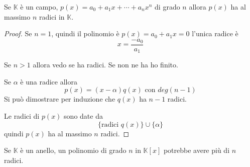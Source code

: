 \begin{theorem}
	Se $\mathbb{K}$ \`e un campo, $p(x) = a_0 + a_1 x + \cdots + a_n x^n$ di grado $n$ allora
	$p(x)$ ha al massimo $n$ radici in $\mathbb{K}$.
	\begin{proof}
		Se $n = 1$, quindi il polinomio \`e $p(x) = a_0 + a_1 x = 0$ l'unica radice \`e
		\begin{equation*}
			x = \frac{-a_0}{a_1}
		\end{equation*}

		Se $n > 1$ allora vedo se ha radici. Se non ne ha ho finito.

		Se $\alpha$ \`e una radice allora
		\begin{equation*}
			p(x) = (x - \alpha) q(x) \text{ con } deg(n - 1)
		\end{equation*}
		Si pu\`o dimostrare per induzione che $q(x)$ ha $n - 1$ radici.

		Le radici di $p(x)$ sono date da
		\begin{equation*}
			\{ \text{radici } q(x) \} \cup \{ \alpha \}
		\end{equation*}
		quindi $p(x)$ ha al massimo $n$ radici.
	\end{proof}
\end{theorem}

\begin{observation}
	Se $\mathbb{K}$ \`e un anello, un polinomio di grado $n$ in $\mathbb{K}[x]$ potrebbe
	avere pi\`u di $n$ radici.
\end{observation}